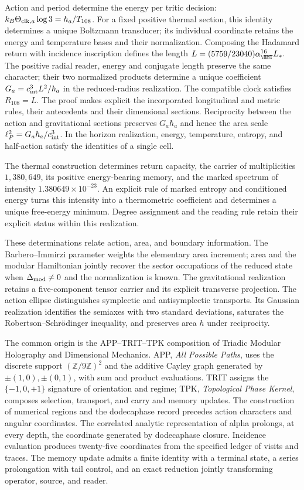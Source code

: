 Action and period determine the energy per tritic decision:
\(k_B\Theta_{{\rm clk},a}\log3=h_a/T_{108}\).
For a fixed positive thermal section, this identity determines a unique
Boltzmann transducer; its individual coordinate retains the energy and
temperature bases and their normalization. Composing the Hadamard
return with incidence inscription defines the length
\(L=(5759/23040)\alpha_{\HMT}^{16}L_*\). The positive radial reader,
energy and conjugate length preserve the same character; their two
normalized products determine a unique coefficient
\(G_a=c_{\rm int}^3L^2/\hbar_a\) in the reduced-radius realization.
The compatible clock satisfies \(R_{108}=L\). The proof makes explicit
the incorporated longitudinal and metric rules, their antecedents and
their dimensional sections.
Reciprocity between the action and gravitational sections preserves
\(G_a\hbar_a\) and hence the area scale
\(\ell_P^2=G_a\hbar_a/c_{\rm int}^3\).
In the horizon realization, energy, temperature, entropy, and half-action
satisfy the identities of a single cell.

The thermal construction determines return capacity, the carrier of
multiplicities \(1,380,649\), its positive energy-bearing memory, and
the marked spectrum of intensity \(1.380649\times10^{-23}\).
An explicit rule of marked entropy and conditioned energy turns this
intensity into a thermometric coefficient and determines a unique
free-energy minimum. Degree assignment and the reading rule retain
their explicit status within this realization.

These determinations relate action, area, and boundary information.
The Barbero--Immirzi parameter weights the elementary area increment;
area and the modular Hamiltonian jointly recover the sector occupations
of the reduced state when \(\Delta_{\rm mod}\ne0\) and the
normalization is known. The gravitational realization retains a
five-component tensor carrier and its explicit transverse projection.
The action ellipse distinguishes symplectic and antisymplectic
transports. Its Gaussian realization identifies the semiaxes with two
standard deviations, saturates the Robertson--Schrödinger inequality,
and preserves area \(h\) under reciprocity.

The common origin is the APP--TRIT--TPK composition of Triadic Modular
Holography and Dimensional Mechanics. APP, \emph{All Possible Paths},
uses the discrete support \((\mathbb Z/9\mathbb Z)^2\) and the
additive Cayley graph generated by \(\pm(1,0),\pm(0,1)\), with
sum and product evaluations. TRIT assigns the \(\{-1,0,+1\}\)
signature of orientation and regime; TPK, \emph{Topological Phase Kernel},
composes selection, transport, and carry and memory updates.
The construction
of numerical regions and the dodecaphase record precedes action
characters and angular coordinates. The correlated analytic
representation of alpha prolongs, at every depth, the coordinate
generated by dodecaphase closure. Incidence evaluation produces
twenty-five coordinates from the specified ledger of visits and traces.
The memory update admits a finite identity with a terminal state, a
series prolongation with tail control, and an exact reduction jointly
transforming operator, source, and reader.

